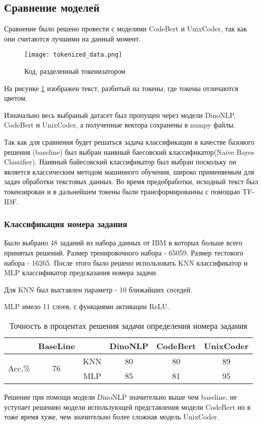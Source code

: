 \documentclass[../part_3.tex]{subfiles}
\begin{document}
\subsection{Сравнение моделей}
\par Сравнение было решено провести с моделями CodeBert\cite{feng2020codebertpretrainedmodelprogramming} и UnixCoder\cite{guo2022unixcoder}, так как они считаются лучшими на данный момент.
\begin{figure}[H]
    \centering
    \texttt{[image: tokenized\_data.png]}
    \caption{Код, разделенный токенизатором}
    \label{fig:tokenized}
\end{figure}
\par На рисунке \ref{fig:tokenized} изображен текст, разбитый на токены, где токены отличаются цветом.
\par Изначально весь выбраный датасет был пропущен через модели DinoNLP, CodeBert и UnixCoder, а полученные вектора сохранены в numpy файлы.
\par Так как для сравнения будет решаться задача классификации в качестве базового решения (baseline) был выбран наивный баесовский классификатор(Naive Bayes Classifier). Наивный байесовский классификатор был выбран поскольку он является классическим методом машинного обучения, широко применяемым для задач обработки текстовых данных. Во время предобработки, исходный текст был токензирован и в дальнейшем токены были трансформированны с помощью TF-IDF.
\subsubsection{Классификация номера задания}
\par Было выбрано 48 заданий из набора данных от IBM в которых больше всего принятых решений. Размер тренировочного набора - 65059. Размер тестового набора - 16265. После этого было решено использовать KNN классификатор и MLP классификатор предсказания номера задачи.
\par Для KNN был выставлен параметр - 10 ближайших соседей.
\par MLP имело 11 слоев, с функциями активации ReLU.
\begin{table}[H]
    \centering
    \begin{tabular}{|c|c||c|c|c|c|}\hline 
        &BaseLine&&DinoNLP&CodeBert&UnixCoder\\ \hline 
        \multirow{2}{*}{Acc,\%}&\multirow{2}{*}{76}&KNN&80&80&89\\\cline{3-6}
        &&MLP&85&81&95\\\hline
    \end{tabular}  
    \caption{Точность в процентах решения задачи определения номера задания}
\end{table}
\par Решение при помощи модели DinoNLP значительно выше чем baseline, не уступает решению модели использующей представления модели CodeBert но в тоже время хуже, чем значительно более сложная модель UnixCoder.
\end{document}
